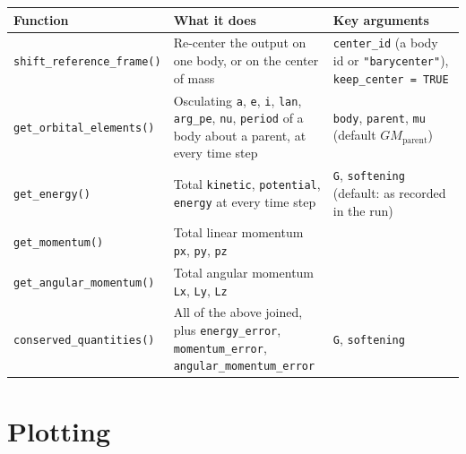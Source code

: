 \documentclass[
  10.5pt,
  letterpaper,
]{scrbook}
\newcounter{none} %
\theoremstyle{plain}
\theoremstyle{remark}
\begin{document}
{\def\LTcaptype{none} %
\begin{longtable}[]{@{}
  >{\raggedright\arraybackslash}p{}
  >{\raggedright\arraybackslash}p{}
  >{\raggedright\arraybackslash}p{}@{}}
\toprule\noalign{}
\begin{minipage}[b]{\linewidth}\raggedright
Function
\end{minipage} & \begin{minipage}[b]{\linewidth}\raggedright
What it does
\end{minipage} & \begin{minipage}[b]{\linewidth}\raggedright
Key arguments
\end{minipage} \\
\midrule\noalign{}
\endhead
\bottomrule\noalign{}
\endlastfoot
\texttt{shift\_reference\_frame()} & Re-center the output on one body,
or on the center of mass & \texttt{center\_id} (a body id or
\texttt{"barycenter"}), \texttt{keep\_center\ =\ TRUE} \\
\texttt{get\_orbital\_elements()} & Osculating \texttt{a}, \texttt{e},
\texttt{i}, \texttt{lan}, \texttt{arg\_pe}, \texttt{nu}, \texttt{period}
of a body about a parent, at every time step & \texttt{body},
\texttt{parent}, \texttt{mu} (default \(GM_{\mathrm{parent}}\)) \\
\texttt{get\_energy()} & Total \texttt{kinetic}, \texttt{potential},
\texttt{energy} at every time step & \texttt{G}, \texttt{softening}
(default: as recorded in the run) \\
\texttt{get\_momentum()} & Total linear momentum \texttt{px},
\texttt{py}, \texttt{pz} & \\
\texttt{get\_angular\_momentum()} & Total angular momentum \texttt{Lx},
\texttt{Ly}, \texttt{Lz} & \\
\texttt{conserved\_quantities()} & All of the above joined, plus
\texttt{energy\_error}, \texttt{momentum\_error},
\texttt{angular\_momentum\_error} & \texttt{G}, \texttt{softening} \\
\end{longtable}
}

\section{Plotting}\label{plotting}
\end{document}
